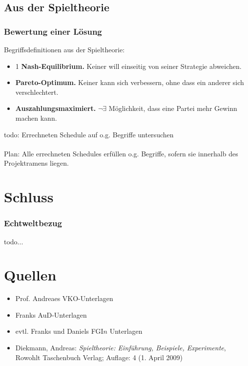 \documentclass[%
	handout,
	compressed
]{beamer}
\begin{document}
	\subsection{Aus der Spieltheorie}
		\begin{frame}
			\frametitle{Bewertung einer Lösung}
			Begriffsdefinitionen aus der Spieltheorie:
			\begin{itemize}
				\item1 \textbf{Nash-Equilibrium.}		Keiner will einseitig von seiner Strategie abweichen.\pause
				\item \textbf{Pareto-Optimum.}			Keiner kann sich verbessern, ohne dass ein anderer sich verschlechtert.\pause
				\item \textbf{Auszahlungsmaximiert.}	$\lnot \exists$ Möglichkeit, dass eine Partei mehr Gewinn machen kann.
			\end{itemize}
		\end{frame}
		\begin{frame}
			todo: Errechneten Schedule auf o.g. Begriffe untersuchen\\
			\-\\
			Plan: Alle errechneten Schedules erfüllen o.g. Begriffe, sofern sie innerhalb des Projektramens liegen.
		\end{frame}
\section{Schluss}
		\begin{frame}
			\frametitle{Echtweltbezug}
			todo...
		\end{frame}
\section{Quellen}
		\begin{frame}
			\begin{itemize}
				\item Prof. Andreaes VKO-Unterlagen
				\item Franks AuD-Unterlagen
				\item evtl. Franks und Daniels FGI$n$ Unterlagen
				\item Diekmann, Andreas: \textit{Spieltheorie: Einführung, Beispiele, Experimente}, Rowohlt Taschenbuch Verlag; Auflage: 4 (1. April 2009)

			\end{itemize}
		\end{frame}
\end{document}
